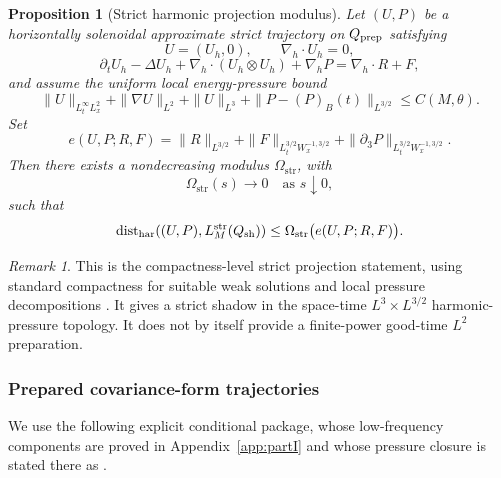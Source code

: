 \documentclass[11pt]{article}
\numberwithin{equation}{section}
\theoremstyle{plain}
\newtheorem{proposition}{Proposition}[section]
\theoremstyle{definition}
\theoremstyle{remark}
\newtheorem{remark}{Remark}[section]
\newcommand{\har}{\mathrm{har}}
\newcommand{\str}{\mathrm{str}}
\begin{document}
\begin{proposition}[Strict harmonic projection modulus]\label{pII:prop:strict-projection-modulus}
Let $(U,P)$ be a horizontally solenoidal approximate strict trajectory on $Q_{\rm prep}$ satisfying
\[
        U=(U_h,0),\qquad \nabla_h\cdot U_h=0,
\]
\[
        \partial_tU_h-\Delta U_h+\nabla_h\cdot(U_h\otimes U_h)+\nabla_hP
        =\nabla_h\cdot R+F,
\]
and assume the uniform local energy-pressure bound
\[
        \|U\|_{L_t^\infty L_x^2}+
        \|\nabla U\|_{L^2}+
        \|U\|_{L^3}+
        \|P-(P)_B(t)\|_{L^{3/2}}
        \le C(M,\theta).
\]
Set
\begin{equation}\label{pII:eq:defect}
        e(U,P;R,F)
        =\|R\|_{L^{3/2}}
        +\|F\|_{L_t^{3/2}W_x^{-1,3/2}}
        +\|\partial_3P\|_{L_t^{3/2}W_x^{-1,3/2}}.
\end{equation}
Then there exists a nondecreasing modulus $\Omega_{\str}$, with
\[
        \Omega_{\str}(s)\to0\quad\text{as }s\downarrow0,
\]
such that
\begin{equation}\label{pII:eq:strict-proj}
        \operatorname{dist}_{\har}((U,P),L_M^{\str}(Q_{\rm sh}))
        \le \Omega_{\str}\bigl(e(U,P;R,F)\bigr).
\end{equation}
\end{proposition}

\begin{remark}
This is the compactness-level strict projection statement, using standard compactness for suitable weak solutions and local pressure decompositions \cite{Simon1986,Seregin2015,Wolf2017}.  It gives a strict shadow in the space-time $L^3\times L^{3/2}$ harmonic-pressure topology.  It does not by itself provide a finite-power good-time $L^2$ preparation.
\end{remark}

\subsubsection{Prepared covariance-form trajectories}

We use the following explicit conditional package, whose low-frequency components are proved in Appendix~\ref{app:partI} and whose pressure closure is stated there as .
\end{document}
